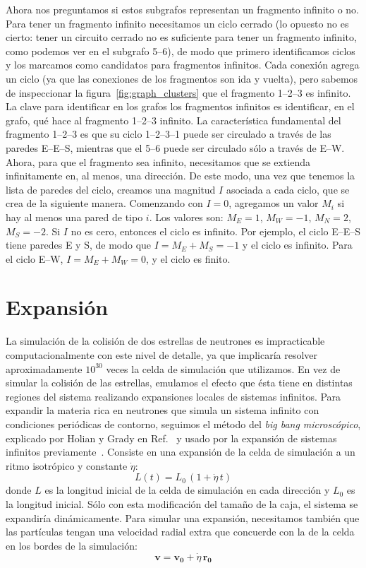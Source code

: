 Ahora nos preguntamos si estos subgrafos representan un fragmento infinito o no.
Para tener un fragmento infinito necesitamos un ciclo cerrado (lo opuesto no es cierto: tener un circuito cerrado no es suficiente para tener un fragmento infinito, como podemos ver en el subgrafo 5--6), de modo que primero identificamos ciclos y los marcamos como candidatos para fragmentos infinitos.
Cada conexión agrega un ciclo (ya que las conexiones de los fragmentos son ida y vuelta), pero sabemos de inspeccionar la figura~\ref{fig:graph_clusters} que el fragmento 1--2--3 es infinito.
La clave para identificar en los grafos los fragmentos infinitos es identificar, en el grafo, qué hace al fragmento 1--2--3 infinito.
La característica fundamental del fragmento 1--2--3 es que su ciclo 1--2--3--1 puede ser circulado a través de las paredes E--E--S, mientras que el 5--6 puede ser circulado sólo a través de E--W.
Ahora, para que el fragmento sea infinito, necesitamos que se extienda infinitamente en, al menos, una dirección.
De este modo, una vez que tenemos la lista de paredes del ciclo, creamos una magnitud $I$ asociada a cada ciclo, que se crea de la siguiente manera.
Comenzando con $I=0$, agregamos un valor $M_i$ si hay al menos una pared de tipo $i$.
Los valores son: $M_E= 1$, $M_W = -1$, $M_N = 2$, $M_S = -2$.
Si $I$ no es cero, entonces el ciclo es infinito.
Por ejemplo, el ciclo  E--E--S tiene paredes E y S, de modo que $I = M_E + M_S = -1$ y el ciclo es infinito.
Para el ciclo E--W, $I = M_E + M_W = 0$, y el ciclo es finito.

\section{Expansión}\label{sc:expansion}
La simulación de la colisión de dos estrellas de neutrones es impracticable computacionalmente con este nivel de detalle, ya que implicaría resolver aproximadamente $10^{30}$ veces la celda de simulación que utilizamos.
En vez de simular la colisión de las estrellas, emulamos el efecto que ésta tiene en distintas regiones del sistema realizando expansiones locales de sistemas infinitos.
Para expandir la materia rica en neutrones que simula un sistema infinito con condiciones periódicas de contorno, seguimos el método del \emph{big bang microscópico}, explicado por Holian y Grady en Ref.~\cite{holian_fragmentation_1988} y usado por la expansión de sistemas infinitos previamente~\cite{dorso_onset_1996}.
Consiste en una expansión de la celda de simulación a un ritmo isotrópico y constante $\dot{\eta}$:
\begin{equation}
  L(t) = L_0\,(1+\dot{\eta}\,t)
\end{equation}
donde $L$ es la longitud inicial de la celda de simulación en cada dirección y $L_0$ es la longitud inicial.
Sólo con esta modificación del tamaño de la caja, el sistema se expandiría dinámicamente.
Para simular una expansión, necesitamos también que las partículas tengan una velocidad radial extra que concuerde con la de la celda en los bordes de la simulación:
\begin{equation}
  \mathbf{v} = \mathbf{v_0} + \dot{\eta}\,\mathbf{r_0}
\end{equation}

